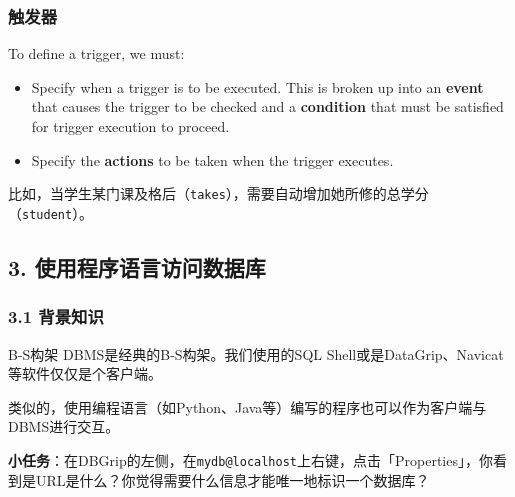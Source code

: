 \documentclass[aspectratio=169, 14pt]{beamer}
\begin{document}
\begin{frame}
    \frametitle{触发器}
To define a trigger, we must:

\begin{itemize}
    \item Specify when a trigger is to be executed. This is broken up into an \textbf{event} that causes the trigger to be checked and a \textbf{condition} that must be satisfied for trigger execution to proceed.
    \item Specify the \textbf{actions} to be taken when the trigger executes.
\end{itemize}

 比如，当学生某门课及格后（\texttt{takes}），需要自动增加她所修的总学分（\texttt{student}）。
\end{frame}

\begin{frame}[fragile]
    \section{\textcolor{darkmidnightblue}{3. 使用程序语言访问数据库}}
\begin{center}
    {\Huge {}   }

{\Huge {}}

{\Huge {}}
\end{center}

\end{frame}

\begin{frame}
    \frametitle{3.1 背景知识}
\begin{exampleblock}{B-S构架}
    DBMS是经典的B-S构架。我们使用的SQL Shell或是DataGrip、Navicat等软件仅仅是个客户端。
\end{exampleblock}

类似的，使用编程语言（如Python、Java等）编写的程序也可以作为客户端与DBMS进行交互。

 \textbf{小任务}：在DBGrip的左侧，在\texttt{mydb@localhost}上右键，点击「Properties」，你看到是URL是什么？你觉得需要什么信息才能唯一地标识一个数据库？

\end{frame}
\end{document}
